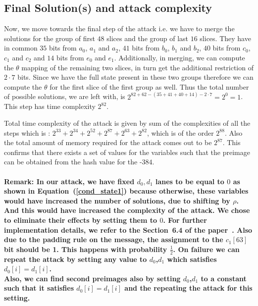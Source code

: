 \subsection{Final Solution(s) and attack complexity}
Now, we move towards the final step of the attack i.e. we have to merge the solutions for the group of first $48$ slices and the group of last $16$ slices. They have in common $35$ bits from $a_0$, $a_1$ and  $a_2$, $41$ bits from $b_0$, $b_1$ and $b_2$, $40$ bits from $c_0$, $c_1$ and $c_2$ and $14$ bits from $e_0$ and $e_1$. Additionally, in merging, we can compute the $\theta$ mapping of the remaining two slices, in turn get the additional restriction of $2\cdot 7$ bits. Since we have the full state present in these two groups therefore we can compute the $\theta$ for the first slice of the first group as well. Thus the total number of possible solutions, we are left with, is $2^{82 + 62 - (35 + 41 + 40 + 14) - 2 \cdot 7} = 2^{0} = 1$. This step has time complexity $ 2^{82}$.

Total time complexity of the attack is given by sum of the complexities of all the steps which is : $2^{33} + 2^{34} + 2^{52} + 2^{87} + 2^{63} + 2^{82}$, which is of the order $2^{88}$.
Also the total amount of memory required for the attack comes out to be $2^{87}$. 
This confirms that there exists a set of values for the variables such that the preimage can be obtained from the hash value for the \Keccak-$384$.


\paragraph{Remark:
In our attack, we have fixed $d_0, d_1$ lanes to be equal to $0$ as shown in Equation~(\ref{cond_state1}) because otherwise, these variables would have increased the number of solutions, due to shifting by $\rho$. 
And this would have increased the complexity of the attack. We chose to eliminate their effects by setting them to $0$. For further implementation details, we refer to the Section~6.4 of the paper~\cite{naya2011practical}. Also due to the padding rule on the message, the assignment to the $c_1[63]$ bit should be 1. This happens with probability $\tfrac{1}{2}$. On failure we can repeat the attack by setting any value to $d_0$,$d_1$ which satisfies $d_0[i]=d_1[i]$. \\
Also, we can find second preimages also by setting $d_0$,$d_1$ to a constant such that it satisfies $d_0[i]=d_1[i]$ and the repeating the attack for this setting.
}

